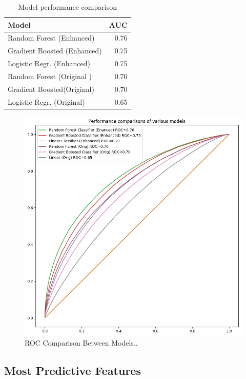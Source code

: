 \documentclass[twocolumn,showpacs,%
  nofootinbib,aps,superscriptaddress,%
  eqsecnum,prd,notitlepage,showkeys,10pt]{revtex4-1}
\begin{document}
\begin{table}
\centering
\begin{tabular}{l|r}
Model & AUC\\\hline
Random Forest (Enhanced) & 0.76 \\
Gradient Boosted (Enhanced) & 0.75 \\
Logistic Regr. (Enhanced) & 0.75\\
Random Forest (Original )& 0.70 \\
Gradient Boosted(Original) & 0.70 \\
Logistic Regr. (Original) & 0.65
\end{tabular}
\caption{\label{tab:widgets}Model performance comparison}
\end{table}


\begin{figure}
\includegraphics[scale=0.35]{roc_final}
\caption{\label{fig:ROC}ROC Comparison Between Models..}
\end{figure}


\subsection{Most Predictive Features}\label{subsec:feats}
\end{document}

